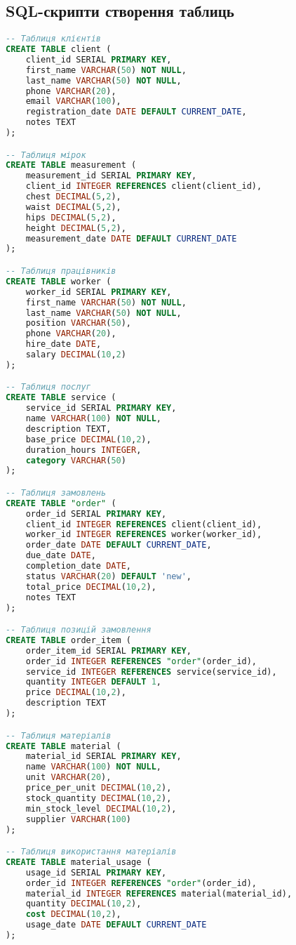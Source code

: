 \documentclass[14pt,a4paper]{extarticle}
\begin{document}
\newpage
\subsection{SQL-скрипти створення таблиць}

\begin{lstlisting}[language=SQL, caption=Створення таблиць бази даних, basicstyle=\small\ttfamily, breaklines=true]
-- Таблиця клієнтів
CREATE TABLE client (
    client_id SERIAL PRIMARY KEY,
    first_name VARCHAR(50) NOT NULL,
    last_name VARCHAR(50) NOT NULL,
    phone VARCHAR(20),
    email VARCHAR(100),
    registration_date DATE DEFAULT CURRENT_DATE,
    notes TEXT
);

-- Таблиця мірок
CREATE TABLE measurement (
    measurement_id SERIAL PRIMARY KEY,
    client_id INTEGER REFERENCES client(client_id),
    chest DECIMAL(5,2),
    waist DECIMAL(5,2),
    hips DECIMAL(5,2),
    height DECIMAL(5,2),
    measurement_date DATE DEFAULT CURRENT_DATE
);

-- Таблиця працівників
CREATE TABLE worker (
    worker_id SERIAL PRIMARY KEY,
    first_name VARCHAR(50) NOT NULL,
    last_name VARCHAR(50) NOT NULL,
    position VARCHAR(50),
    phone VARCHAR(20),
    hire_date DATE,
    salary DECIMAL(10,2)
);

-- Таблиця послуг
CREATE TABLE service (
    service_id SERIAL PRIMARY KEY,
    name VARCHAR(100) NOT NULL,
    description TEXT,
    base_price DECIMAL(10,2),
    duration_hours INTEGER,
    category VARCHAR(50)
);

-- Таблиця замовлень
CREATE TABLE "order" (
    order_id SERIAL PRIMARY KEY,
    client_id INTEGER REFERENCES client(client_id),
    worker_id INTEGER REFERENCES worker(worker_id),
    order_date DATE DEFAULT CURRENT_DATE,
    due_date DATE,
    completion_date DATE,
    status VARCHAR(20) DEFAULT 'new',
    total_price DECIMAL(10,2),
    notes TEXT
);

-- Таблиця позицій замовлення
CREATE TABLE order_item (
    order_item_id SERIAL PRIMARY KEY,
    order_id INTEGER REFERENCES "order"(order_id),
    service_id INTEGER REFERENCES service(service_id),
    quantity INTEGER DEFAULT 1,
    price DECIMAL(10,2),
    description TEXT
);

-- Таблиця матеріалів
CREATE TABLE material (
    material_id SERIAL PRIMARY KEY,
    name VARCHAR(100) NOT NULL,
    unit VARCHAR(20),
    price_per_unit DECIMAL(10,2),
    stock_quantity DECIMAL(10,2),
    min_stock_level DECIMAL(10,2),
    supplier VARCHAR(100)
);

-- Таблиця використання матеріалів
CREATE TABLE material_usage (
    usage_id SERIAL PRIMARY KEY,
    order_id INTEGER REFERENCES "order"(order_id),
    material_id INTEGER REFERENCES material(material_id),
    quantity DECIMAL(10,2),
    cost DECIMAL(10,2),
    usage_date DATE DEFAULT CURRENT_DATE
);
\end{lstlisting}
\end{document}
